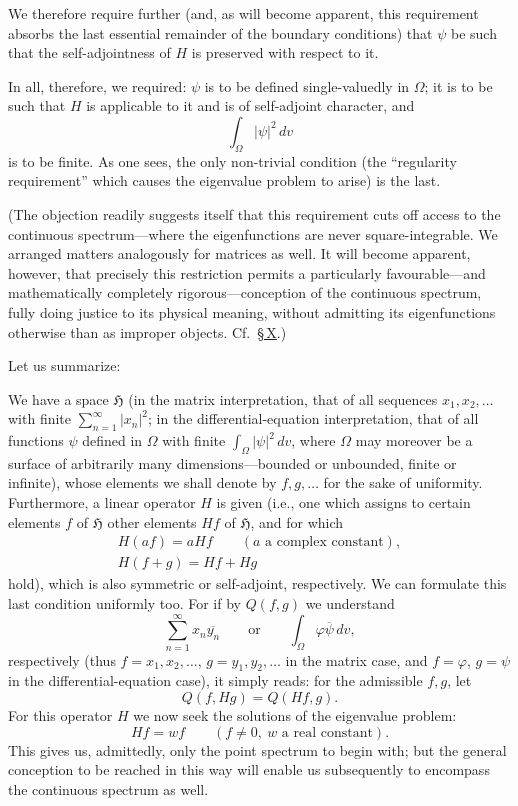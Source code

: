 \documentclass[fontsize=13pt,paper=b5,twoside,bookmarkpackage=false]{scrartcl}
\newcommand{\Sec}[1]{\hyperref[sec:#1]{\S\,#1}}
\begin{document}
We therefore require further (and, as will become apparent, this requirement absorbs the last essential remainder of the boundary conditions) that $\psi$ be such that the self-adjointness of $H$ is preserved with respect to it.

In all, therefore, we required: $\psi$ is to be defined single-valuedly in $\Omega$; it is to be such that $H$ is applicable to it and is of self-adjoint character, and
\[
\int_\Omega|\psi|^2\,dv
\]
is to be finite. As one sees, the only non-trivial condition (the ``regularity requirement'' which causes the eigenvalue problem to arise) is the last.

(The objection readily suggests itself that this requirement cuts off access to the continuous spectrum---where the eigenfunctions are never square-integrable. We arranged matters analogously for matrices as well. It will become apparent, however, that precisely this restriction permits a particularly favourable---and mathematically completely rigorous---conception of the continuous spectrum, fully doing justice to its physical meaning, without admitting its eigenfunctions otherwise than as improper objects. Cf.\ \Sec{X}.)

Let us summarize:

We have a space $\mathfrak{H}$ (in the matrix interpretation, that of all sequences $x_1,x_2,\ldots$ with finite $\sum_{n=1}^{\infty}|x_n|^2$; in the differential-equation interpretation, that of all functions $\psi$ defined in $\Omega$ with finite $\int_\Omega|\psi|^2\,dv$, where $\Omega$ may moreover be a surface of arbitrarily many dimensions---bounded or unbounded, finite or infinite), whose elements we shall denote by $f,g,\ldots$ for the sake of uniformity. Furthermore, a linear operator $H$ is given (i.e., one which assigns to certain elements $f$ of $\mathfrak{H}$ other elements $Hf$ of $\mathfrak{H}$, and for which
\begin{gather*}
H(af)=aHf\qquad(a\text{ a complex constant}),\\
H(f+g)=Hf+Hg
\end{gather*}
hold), which is also symmetric or self-adjoint, respectively. We can formulate this last condition uniformly too. For if by $Q(f,g)$ we understand
\[
\sum_{n=1}^{\infty}x_n\overline{y_n}\qquad\text{or}\qquad
\int_\Omega\varphi\overline{\psi}\,dv,
\]
respectively (thus $f=x_1,x_2,\ldots$, $g=y_1,y_2,\ldots$ in the matrix case, and $f=\varphi$, $g=\psi$ in the differential-equation case), it simply reads: for the admissible $f,g$, let
\[
Q(f,Hg)=Q(Hf,g).
\]
For this operator $H$ we now seek the solutions of the eigenvalue problem:
\[
Hf=wf\qquad(f\ne0,\ w\text{ a real constant}).
\]
This gives us, admittedly, only the point spectrum to begin with; but the general conception to be reached in this way will enable us subsequently to encompass the continuous spectrum as well.
\end{document}
